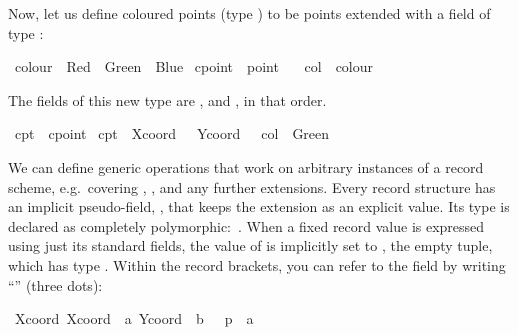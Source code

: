 \begin{isabellebody}
\begin{isamarkuptext}
  Now, let us define coloured points (type ) to be
  points extended with a field  of type :%
\end{isamarkuptext}%
\isamarkuptrue%
\isamarkupfalse%
\ colour\ {}\ Red\ {}\ Green\ {}\ Blue\isanewline
\isanewline
{}\isamarkupfalse%
\ cpoint\ {}\ point\ {}\isanewline
\ \ col\ {}{}\ colour%
\begin{isamarkuptext}%
\noindent
  The fields of this new type are ,  and
  , in that order.%
\end{isamarkuptext}%
\isamarkuptrue%
\isamarkupfalse%
\ cpt{}\ {}{}\ cpoint\ \isanewline
{}cpt{}\ {}\ {}Xcoord\ {}\ {}{}{}{}\ Ycoord\ {}\ {}{}{}\ col\ {}\ Green{}{}%
\begin{isamarkuptext}%
We can define generic operations that work on arbitrary
  instances of a record scheme, e.g.\ covering , , and any further extensions.  Every record structure has an
  implicit pseudo-field, , that keeps the extension as an
  explicit value.  Its type is declared as completely
  polymorphic:~.  When a fixed record value is expressed
  using just its standard fields, the value of  is
  implicitly set to , the empty tuple, which has type
  .  Within the record brackets, you can refer to the
   field by writing ``'' (three dots):%
\end{isamarkuptext}%
\isamarkuptrue%
\isamarkupfalse%
\ {}Xcoord\ {}Xcoord\ {}\ a{}\ Ycoord\ {}\ b{}\ {}\ {}\ p{}\ {}\ a{}\isanewline

\end{isabellebody}
